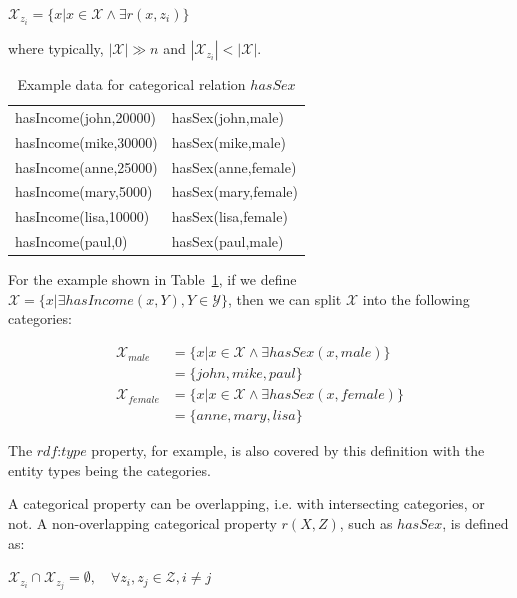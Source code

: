 \begin{center}
$\mathcal{X}_{z_i}= \{ x | x \in \mathcal{X} \wedge \exists r(x,z_i) \}$ 
\end{center}

where typically, $|\mathcal{X}| \gg n$ and  $|\mathcal{X}_{z_i}| < |\mathcal{X}|$.

\begin{table}[h!]
 \begin{center}
 \caption{Example data for categorical relation $hasSex$}
  \begin{tabular}{*{2}{l}}
    \toprule
    hasIncome(john,20000) & hasSex(john,male) 	\\
    hasIncome(mike,30000) & hasSex(mike,male) 	\\
    hasIncome(anne,25000) & hasSex(anne,female) 	\\
    hasIncome(mary,5000)  & hasSex(mary,female) 	\\
    hasIncome(lisa,10000) & hasSex(lisa,female)	\\
    hasIncome(paul,0)	  & hasSex(paul,male)	\\
    \bottomrule
  \end{tabular}
 \label{tab:cat1}
 \end{center}

\end{table}
  
For the example shown in Table~\ref{tab:cat1}, if we define $\mathcal{X}=\{ x|\exists hasIncome(x,Y), Y \in \mathcal{Y}
\}$, then we can split $\mathcal{X}$ into the following categories:

\begin{align*}
 \mathcal{X}_{male}&=\{ x|x \in \mathcal{X} \wedge \exists hasSex(x,male)\} \\
  &=\{john,mike,paul\} \\
\mathcal{X}_{female}&=\{ x|x \in \mathcal{X} \wedge \exists hasSex(x,female)\} \\
  &=\{anne,mary,lisa\}
\end{align*}


The $rdf$:$type$ property, for example, is also covered by this definition with the entity types being the categories.

A categorical property can be overlapping, i.e. with intersecting categories, or not. A non-overlapping categorical
property $r(X,Z)$, such as $hasSex$, is defined as:

\begin{center}
$\mathcal{X}_{z_i} \cap \mathcal{X}_{z_j} = \emptyset, \quad \forall z_i,z_j \in \mathcal{Z}, i \neq j$ 
\end{center}

